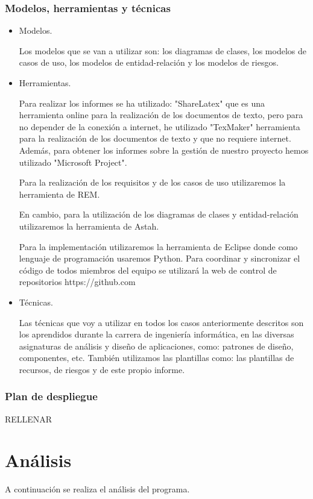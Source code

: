 \documentclass[a4paper,11pt, twoside]{article}
\begin{document}
\subsubsection{Modelos, herramientas y técnicas}
\begin{itemize}[noitemsep,topsep=0pt]
\item Modelos.

\quad Los modelos que se van a utilizar son: los diagramas de clases, los modelos de casos de uso, los modelos de entidad-relación y los modelos de riesgos. 

\item Herramientas.

\quad Para realizar los informes se ha utilizado: "ShareLatex" que es una herramienta online para la realización de los documentos de texto, pero para no depender de la conexión a internet, he utilizado "TexMaker" herramienta para la realización de los documentos de texto y que no requiere internet. Además, para obtener los informes sobre la gestión de nuestro proyecto hemos utilizado "Microsoft Project".

\quad Para la realización de los requisitos y de los casos de uso utilizaremos la herramienta de REM.

\quad En cambio, para la utilización de los diagramas de clases y entidad-relación utilizaremos la herramienta de Astah.

\quad Para la implementación utilizaremos la herramienta de Eclipse donde como lenguaje de programación usaremos Python. Para coordinar y sincronizar el código de todos miembros del equipo se utilizará la web de control de repositorios https://github.com

\item Técnicas.

\quad Las técnicas que voy a utilizar en todos los casos anteriormente descritos son los aprendidos durante la carrera de ingeniería informática, en las diversas asignaturas de análisis y diseño de aplicaciones, como: patrones de diseño, componentes, etc. También utilizamos las plantillas como: las plantillas de recursos, de riesgos y de este propio informe.

\end{itemize}
\subsubsection{Plan de despliegue}
{\color{red} RELLENAR }
\section{Análisis}
A continuación se realiza el análisis del programa.
\end{document}
